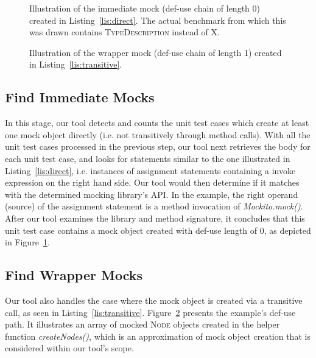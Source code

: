 \begin{figure}
	\centering
	
	\caption{Illustration of the immediate mock (def-use chain of length 0) created in Listing~\ref{lis:direct}. The actual benchmark from which this was drawn contains \textsc{TypeDescription} instead of  \textsc{X}.} 
	\label{fig:immediate}
\end{figure}

\begin{figure}
	\centering
	
	\caption{Illustration of the wrapper mock (def-use chain of length 1) created in Listing~\ref{lis:transitive}.}
	\label{fig:wrapper}
\end{figure}

\subsection{Find Immediate Mocks}
\label{subsec:immediate}

In this stage, our tool detects and counts the unit test cases which create at least one mock object directly (i.e. not transitively through method calls). With all the unit test cases processed in the previous step, our tool next retrieves the body for each unit test case, and looks for statements similar to the one illustrated in Listing~\ref{lis:direct}, i.e. instances of assignment statements containing a invoke expression on the right hand side. Our tool would then determine if it matches with the determined mocking library's API. In the example, the right operand (source) of the assignment statement is a method invocation of \textit{Mockito.mock()}. After our tool examines the library and method signature, it concludes that this unit test case contains a mock object created with def-use length of 0, as depicted in Figure~\ref{fig:immediate}. 


\subsection{Find Wrapper Mocks}
\label{subsec:wrapper}

Our tool also handles the case where the mock object is created via a transitive call, as seen in Listing~\ref{lis:transitive}. Figure~\ref{fig:wrapper} presents the example's def-use path. It illustrates an array of mocked \textsc{Node} objects created in the helper function \textit{createNodes()}, which is an approximation of mock object creation that is considered within our tool's scope.


